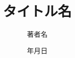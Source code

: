 \documentclass[a4paper,12pt]{jarticle}
\begin{document}
\title{タイトル名}
\author{著者名}
\date{年月日}
\maketitle
\end{document}

